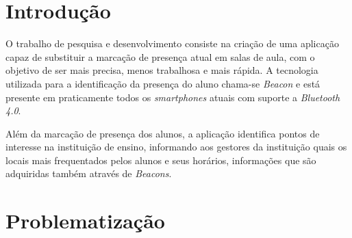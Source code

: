 \documentclass[
	12pt,
	oneside,
	a4paper,
	english,
	brazil,
]{abntex2}
\begin{document}
\frenchspacing 


\imprimircapa

\imprimirfolhaderosto


\tableofcontents*


\newpage
\textual

\chapter*[Introdução]{Introdução}

O trabalho de pesquisa e desenvolvimento consiste na criação de uma aplicação capaz de substituir a marcação de presença atual em salas de aula, com o objetivo de ser mais precisa, menos trabalhosa e mais rápida. A tecnologia utilizada para a identificação da presença do aluno chama-se \emph{Beacon} e está presente em praticamente todos os \emph{smartphones} atuais com suporte a \emph{Bluetooth 4.0}.

Além da marcação de presença dos alunos, a aplicação identifica pontos de interesse na instituição de ensino, informando aos gestores da instituição quais os locais mais frequentados pelos alunos e seus horários, informações que são adquiridas também através de \emph{Beacons}.


\chapter{Problematização}
\end{document}
